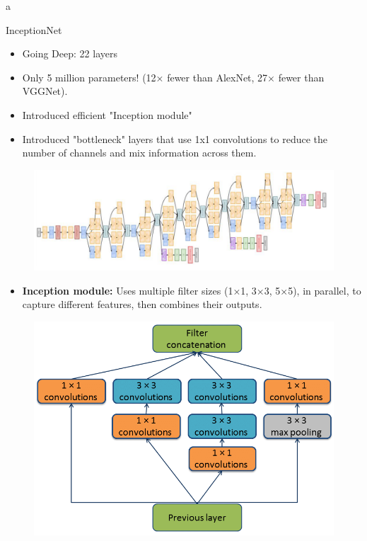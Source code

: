 a\documentclass[10pt]{beamer}
\theoremstyle{remark}
\theoremstyle{definition}
\begin{document}
\begin{frame}[allowframebreaks]{InceptionNet}
    \begin{itemize}
        \item Going Deep: 22 layers
        \item Only 5 million parameters! (12× fewer than AlexNet, 27× fewer than VGGNet).
        \item Introduced efficient "Inception module"
        \item Introduced "bottleneck" layers that use 1x1 convolutions to reduce the number of channels and mix information across them.
    \end{itemize}

\begin{figure}
\centering
\includegraphics[width=1.0\textwidth,height=0.5\textheight,keepaspectratio]{./images/inceptionnet_1.png}
\end{figure}

\framebreak

    \begin{itemize}
        \item \textbf{Inception module:} Uses multiple filter sizes (1×1, 3×3, 5×5), in parallel, to capture different features, then combines their outputs.

    \end{itemize}

\begin{figure}
\centering
\includegraphics[width=1.0\textwidth,height=0.8\textheight,keepaspectratio]{./images/inception_mod.png}
\end{figure}

\end{frame}
\end{document}

